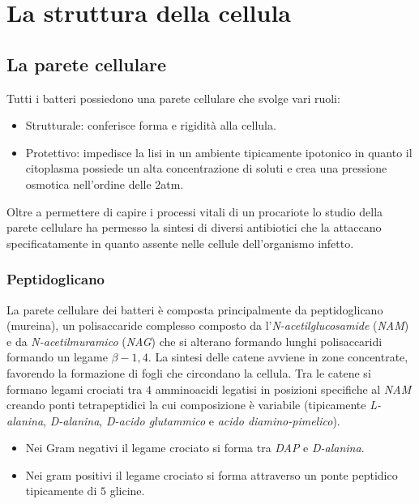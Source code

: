 \chapter{La struttura della cellula}
\section{La parete cellulare}
Tutti i batteri possiedono una parete cellulare che svolge vari ruoli:
\begin{itemize}
	\item Strutturale: conferisce forma e rigidit\`a alla cellula.
	\item Protettivo: impedisce la lisi in un ambiente tipicamente ipotonico in quanto il citoplasma possiede un alta concentrazione di soluti e crea una pressione osmotica 
		nell'ordine delle $2$\si{atm}.
\end{itemize}
Oltre a permettere di capire i processi vitali di un procariote lo studio della parete cellulare ha permesso la sintesi di diversi antibiotici che la attaccano specificatamente in 
quanto assente nelle cellule dell'organismo infetto.
\subsection{Peptidoglicano}
La parete cellulare dei batteri \`e composta principalmente da peptidoglicano (mureina), un polisaccaride complesso composto da l'\emph{N-acetilglucosamide} (\emph{NAM}) e da 
\emph{N-acetilmuramico} (\emph{NAG}) che si alterano formando lunghi polisaccaridi formando un legame $\beta-1,4$. La sintesi delle catene avviene in zone concentrate, favorendo 
la formazione di fogli che circondano la cellula. Tra le catene si formano legami crociati tra $4$ amminoacidi legatisi in posizioni specifiche al \emph{NAM} creando ponti tetrapeptidici
la cui composizione \`e variabile (tipicamente \emph{L-alanina}, \emph{D-alanina}, \emph{D-acido glutammico} e \emph{acido diamino-pimelico}). 
\begin{itemize}
	\item Nei Gram negativi il legame crociato si forma tra \emph{DAP} e \emph{D-alanina}.
	\item Nei gram positivi il legame crociato si forma attraverso un ponte peptidico tipicamente di $5$ glicine.
\end{itemize}
